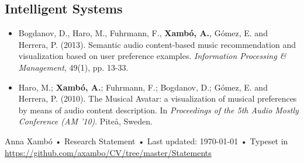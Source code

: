 \documentclass[10pt, a4paper]{article}
\begin{document}
\subsection*{Intelligent Systems}

\begin{itemize}
\item Bogdanov, D., Haro, M., Fuhrmann, F., \textbf{Xambó, A.}, Gómez, E. and Herrera, P. (2013). Semantic audio content-based music recommendation and visualization based on user preference examples. \emph{Information Processing \& Management}, 49(1), pp. 13-33.
\item Haro, M.; \textbf{Xambó, A.}; Fuhrmann, F.; Bogdanov, D.; Gómez, E. and Herrera, P. (2010). The Musical Avatar: a visualization of musical preferences by means of audio content description. In \emph{Proceedings of the 5th Audio Mostly Conference (AM '10)}. Piteå, Sweden.
\end{itemize}

\vfill{}

\begin{center}
{\scriptsize  Anna Xambó •\- Research Statement •\- Last updated: \today\- •\- %
Typeset in \href{http://nitens.org/taraborelli/cvtex}{
\XeTeX }\\

\href{https://github.com/axambo/CV/tree/master/Statements}{https://github.com/axambo/CV/tree/master/Statements}}
\end{center}
\end{document}
